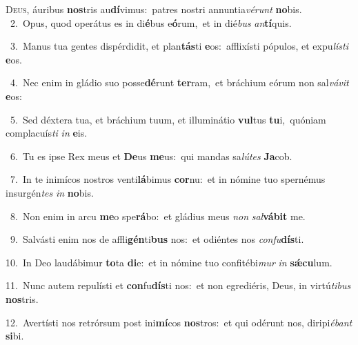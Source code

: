 \lettrine{\initial\textcolor{\initialcolor}{D}}{eus,} áuribus \textbf{nos}\-tris au\-\textbf{dí}\-vimus:~\star patres nostri annuntia\-\textit{vé}\-\textit{runt} \textbf{no}\-bis.\\
{\numbfont\textcolor{\numbcolor}{~2.}}~Opus, quod operátus es in di\-\textbf{é}\-bus e\-\textbf{ó}\-rum,~\star et in dié\textit{bus} \textit{an}\-\textbf{tí}quis.\par
{\numbfont\textcolor{\numbcolor}{~3.}}~Manus tua gentes dispérdidit, et plan\-\textbf{tás}\-ti \textbf{e}\-os:~\star afflixísti pópulos, et expu\-\textit{lís}\-\textit{ti} \textbf{e}\-os.\par
{\numbfont\textcolor{\numbcolor}{~4.}}~Nec enim in gládio suo posse\-\textbf{dé}\-runt \textbf{ter}\-ram,~\star et bráchium eórum non sal\-\textit{vá}\-\textit{vit} \textbf{e}\-os:\par
{\numbfont\textcolor{\numbcolor}{~5.}}~Sed déxtera tua, et bráchium tuum, et illuminátio \textbf{vul}\-tus \textbf{tu}\-i,~\star quóniam complacuís\textit{ti} \textit{in} \textbf{e}\-is.\par
{\numbfont\textcolor{\numbcolor}{~6.}}~Tu es ipse Rex meus et \textbf{De}\-us \textbf{me}\-us:~\star qui mandas sa\-\textit{lú}\-\textit{tes} \textbf{Ja}\-cob.\par
{\numbfont\textcolor{\numbcolor}{~7.}}~In te inimícos nostros venti\-\textbf{lá}\-bimus \textbf{cor}\-nu:~\star et in nómine tuo spernémus insurgén\textit{tes} \textit{in} \textbf{no}\-bis.\par
{\numbfont\textcolor{\numbcolor}{~8.}}~Non enim in arcu \textbf{me}\-o spe\-\textbf{rá}\-bo:~\star et gládius meus \textit{non} \textit{sal}\-\textbf{vá}\textbf{bit} me.\par
{\numbfont\textcolor{\numbcolor}{~9.}}~Salvásti enim nos de affli\-\textbf{gén}\-ti\textbf{bus} nos:~\star et odiéntes nos \textit{con}\-\textit{fu}\textbf{dís}ti.\par
{\numbfont\textcolor{\numbcolor}{10.}}~In Deo laudábimur \textbf{to}\-ta \textbf{di}\-e:~\star et in nómine tuo confitébi\textit{mur} \textit{in} \textbf{sǽ}\-\textbf{cu}lum.\par
{\numbfont\textcolor{\numbcolor}{11.}}~Nunc autem repulísti et \textbf{con}\-fu\-\textbf{dís}\-ti nos:~\star et non egrediéris, Deus, in virtú\-\textit{ti}\-\textit{bus} \textbf{nos}\-tris.\par
{\numbfont\textcolor{\numbcolor}{12.}}~Avertísti nos retrórsum post ini\-\textbf{mí}\-cos \textbf{nos}\-tros:~\star et qui odérunt nos, diripi\-\textit{é}\-\textit{bant} \textbf{si}\-bi.\par
